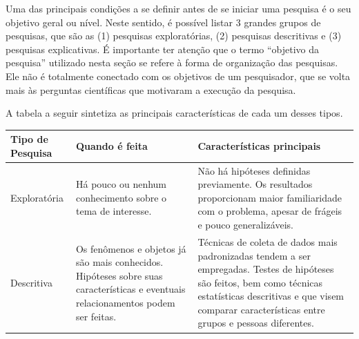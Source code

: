 \documentclass[
]{book}
\begin{document}
Uma das principais condições a se definir antes de se iniciar uma pesquisa é o seu objetivo geral ou nível. Neste sentido, é possível listar 3 grandes grupos de pesquisas, que são as (1) pesquisas exploratórias, (2) pesquisas descritivas e (3) pesquisas explicativas. É importante ter atenção que o termo ``objetivo da pesquisa'' utilizado nesta seção se refere à forma de organização das pesquisas. Ele não é totalmente conectado com os objetivos de um pesquisador, que se volta mais às perguntas científicas que motivaram a execução da pesquisa.

A tabela a seguir sintetiza as principais características de cada um desses tipos.

\begin{longtable}[]{@{}lll@{}}
\toprule
\begin{minipage}[b]{0.30\columnwidth}\raggedright
Tipo de Pesquisa\strut
\end{minipage} & \begin{minipage}[b]{0.30\columnwidth}\raggedright
Quando é feita\strut
\end{minipage} & \begin{minipage}[b]{0.30\columnwidth}\raggedright
Características principais\strut
\end{minipage}\tabularnewline
\midrule
\endhead
\begin{minipage}[t]{0.30\columnwidth}\raggedright
Exploratória\strut
\end{minipage} & \begin{minipage}[t]{0.30\columnwidth}\raggedright
Há pouco ou nenhum conhecimento sobre o tema de interesse.\strut
\end{minipage} & \begin{minipage}[t]{0.30\columnwidth}\raggedright
Não há hipóteses definidas previamente. Os resultados proporcionam maior familiaridade com o problema, apesar de frágeis e pouco generalizáveis.\strut
\end{minipage}\tabularnewline
\begin{minipage}[t]{0.30\columnwidth}\raggedright
Descritiva\strut
\end{minipage} & \begin{minipage}[t]{0.30\columnwidth}\raggedright
Os fenômenos e objetos já são mais conhecidos. Hipóteses sobre suas características e eventuais relacionamentos podem ser feitas.\strut
\end{minipage} & \begin{minipage}[t]{0.30\columnwidth}\raggedright
Técnicas de coleta de dados mais padronizadas tendem a ser empregadas. Testes de hipóteses são feitos, bem como técnicas estatísticas descritivas e que visem comparar características entre grupos e pessoas diferentes.\strut

\end{minipage}
\end{longtable}
\end{document}
